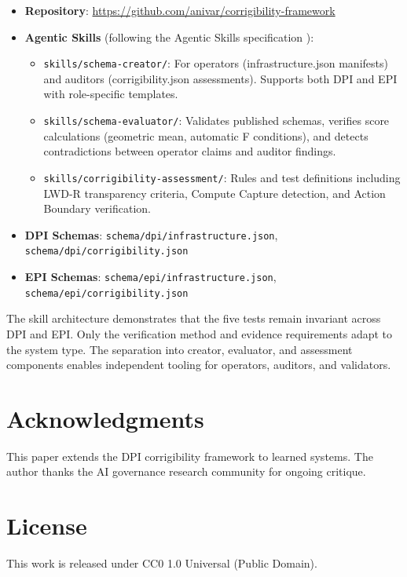 \documentclass[11pt,a4paper]{article}
\theoremstyle{definition}
\begin{document}
\begin{itemize}
    \item \textbf{Repository}: \url{https://github.com/anivar/corrigibility-framework}
    \item \textbf{Agentic Skills} (following the Agentic Skills specification \citep{agentskills2025}):
    \begin{itemize}
        \item \texttt{skills/schema-creator/}: For operators (infrastructure.json manifests) and auditors (corrigibility.json assessments). Supports both DPI and EPI with role-specific templates.
        \item \texttt{skills/schema-evaluator/}: Validates published schemas, verifies score calculations (geometric mean, automatic F conditions), and detects contradictions between operator claims and auditor findings.
        \item \texttt{skills/corrigibility-assessment/}: Rules and test definitions including LWD-R transparency criteria, Compute Capture detection, and Action Boundary verification.
    \end{itemize}
    \item \textbf{DPI Schemas}: \texttt{schema/dpi/infrastructure.json}, \texttt{schema/dpi/corrigibility.json}
    \item \textbf{EPI Schemas}: \texttt{schema/epi/infrastructure.json}, \texttt{schema/epi/corrigibility.json}
\end{itemize}

The skill architecture demonstrates that the five tests remain invariant across DPI and EPI. Only the verification method and evidence requirements adapt to the system type. The separation into creator, evaluator, and assessment components enables independent tooling for operators, auditors, and validators.

\section*{Acknowledgments}

This paper extends the DPI corrigibility framework \citep{paper1} to learned systems. The author thanks the AI governance research community for ongoing critique.

\section*{License}

This work is released under CC0 1.0 Universal (Public Domain).
\end{document}
